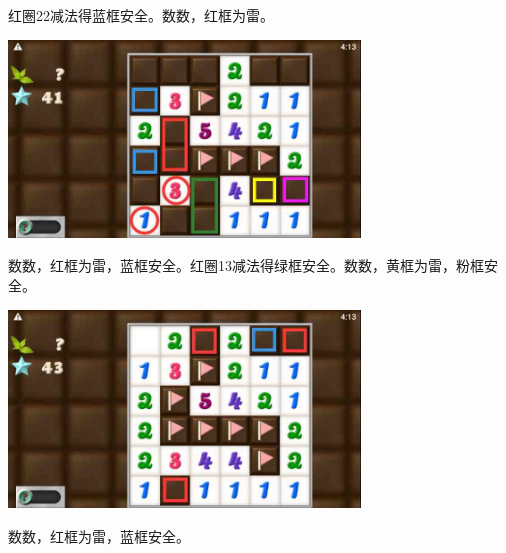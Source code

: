 红圈22减法得蓝框安全。数数，红框为雷。
\begin{center}
    \includegraphics[width=0.7\textwidth]{puzzlelow/245-5.jpg}
\end{center}
数数，红框为雷，蓝框安全。红圈13减法得绿框安全。数数，黄框为雷，粉框安全。
\begin{center}
    \includegraphics[width=0.7\textwidth]{puzzlelow/245-6.jpg}
\end{center}
数数，红框为雷，蓝框安全。

